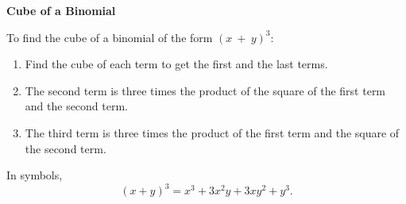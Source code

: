 \begin{center}
\textbf{Cube of a Binomial}
\end{center}

\vspace*{1ex}

To find the cube of a binomial of the form $(x~+~y)^{3}$:
\begin{enumerate}
\item Find the cube of each term to get the first and the last terms.      
\item The second term is three  times the product of the  square of the first term and the second term.
\item The third term is three  times the product of the first term and the square of the second term.
\end{enumerate}

In  symbols,  
$$(x + y)^{3} = x^{3} + 3x^{2}y + 3xy^{2} + y^{3}. $$  